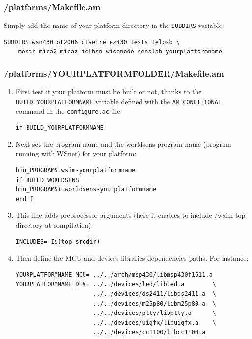 \documentclass[a4paper,10pt]{report}
\begin{document}
\subsubsection{/platforms/Makefile.am}
Simply add the name of your platform directory in the \verb$SUBDIRS$ variable.
\begin{verbatim}
SUBDIRS=wsn430 ot2006 otsetre ez430 tests telosb \
	mosar mica2 micaz iclbsn wisenode senslab yourplatformname
\end{verbatim}

\subsubsection{/platforms/YOURPLATFORMFOLDER/Makefile.am}
\label{yourplatformmakefile}
\begin{enumerate}
  \item First test if your platform must be built or not, thanks to the \verb$BUILD_YOURPLATFORMNAME$ variable defined with the \verb$AM_CONDITIONAL$ command in the \verb$configure.ac$ file: 
\begin{verbatim}
if BUILD_YOURPLATFORMNAME
\end{verbatim}

 \item  Next set the program name and the worldsens program name (program running with WSnet) for your platform:
\begin{verbatim}
bin_PROGRAMS=wsim-yourplatformname
if BUILD_WORLDSENS
bin_PROGRAMS+=worldsens-yourplatformname
endif
\end{verbatim}

  \item This line adds preprocessor arguments (here it enables to include /wsim top directory at compilation):
\begin{verbatim}
INCLUDES=-I$(top_srcdir)
\end{verbatim}

  \item Then define the MCU and devices libraries dependencies paths. For instance:
\begin{verbatim}
YOURPLATFORMNAME_MCU= ../../arch/msp430/libmsp430f1611.a
YOURPLATFORMNAME_DEV= ../../devices/led/libled.a        \
                      ../../devices/ds2411/libds2411.a  \
                      ../../devices/m25p80/libm25p80.a  \
                      ../../devices/ptty/libptty.a      \
                      ../../devices/uigfx/libuigfx.a    \
                      ../../devices/cc1100/libcc1100.a
\end{verbatim}


\end{enumerate}
\end{document}
